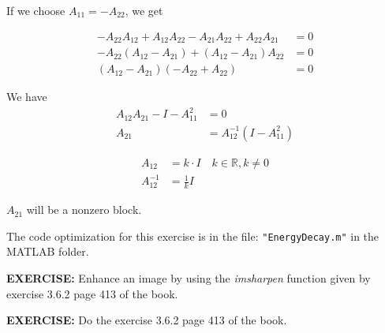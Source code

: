 If we choose $A_{11} = -A_{22}$, we get

\begin{align*}
-A_{22}A_{12} + A_{12}A_{22} - A_{21}A_{22} + A_{22}A_{21} &= 0 \\
-A_{22}(A_{12} - A_{21}) + (A_{12} - A_{21})A_{22} &= 0 \\
(A_{12} - A_{21})(-A_{22} + A_{22}) &= 0
\end{align*}

We have
\begin{align*}
A_{12}A_{21} - I - A_{11}^2 &= 0 \\
A_{21} &= A_{12}^{-1}(I - A_{11}^2)
\end{align*}

\begin{align*}
A_{12} &= k \cdot I \quad k \in \mathbb{R}, k \neq 0 \\
A_{12}^{-1} &= \frac{1}{k} I
\end{align*}

$A_{21}$ will be a nonzero block.

The code optimization for this exercise is in the file: \texttt{"EnergyDecay.m"} in the MATLAB folder.

\textbf{EXERCISE:} Enhance an image by using the \textit{imsharpen} function given by exercise 3.6.2 page 413 of the book.

\textbf{EXERCISE:} Do the exercise 3.6.2 page 413 of the book.